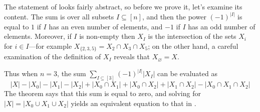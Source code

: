 The statement of  looks fairly abstract, so before we prove it, let's examine its content. The sum is over all subsets $I \subseteq [n]$, and then the power $(-1)^{|I|}$ is equal to $1$ if $I$ has an even number of elements, and $-1$ if $I$ has an odd number of elements. Moreover, if $I$ is non-empty then $X_I$ is the intersection of the sets $X_i$ for $i \in I$---for example $X_{\{2,3,5\}} = X_2 \cap X_3 \cap X_5$; on the other hand, a careful examination of the definition of $X_I$ reveals that $X_{\varnothing} = X$.

Thus when $n=3$, the sum $\sum_{I \subseteq [3]} (-1)^{|I|} |X_I|$ can be evaluated as
\[ |X| - |X_0| - |X_1| - |X_2| + |X_0 \cap X_1| + |X_0 \cap X_2| + |X_1 \cap X_2| - |X_0 \cap X_1 \cap X_2| \]
The theorem says that this sum is equal to zero, and solving for $|X| = |X_0 \cup X_1 \cup X_2|$ yields an equivalent equation to that in .

